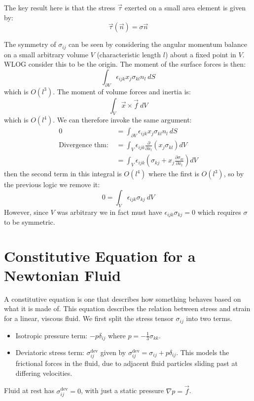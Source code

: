 \documentclass[../Main.tex]{subfiles}
\begin{document}
The key result here is that the stress $\vec\tau$ exerted on a small area element is given by:
\begin{equation*}
    \vec\tau(\vec{n}) = \sigma\vec{n}
\end{equation*}

The symmetry of $\sigma_{ij}$ can be seen by considering the angular momentum balance on a small arbitrary volume $V$ (characteristic length $l$) about a fixed point in $V$. WLOG consider this to be the origin. The moment of the surface forces is then:
\begin{equation*}
    \int_{\partial V} \epsilon_{ijk} x_j \sigma_{kl} n_l~dS
\end{equation*}
which is $O(l^3)$. The moment of volume forces and inertia is:
\begin{equation*}
    \int_V \vec{x} \times \vec{f}~dV
\end{equation*}
which is $O(l^4)$. We can therefore invoke the same argument:
\begin{align*}
    0 &= \int_{\partial V} \epsilon_{ijk} x_j \sigma_{kl} n_l~dS \\
    \text{Divergence thm: } &= \int_V \epsilon_{ijk} \frac{\partial}{\partial x_l} \left(x_j \sigma_{kl}\right) dV \\
    &= \int_V \epsilon_{ijk} \left(\sigma_{kj} + x_j \frac{\partial \sigma_{kl}}{\partial x_l}\right) dV
\end{align*}
then the second term in this integral is $O(l^4)$ where the first is $O(l^3)$, so by the previous logic we remove it:
\begin{equation*}
    0 = \int_V \epsilon_{ijk} \sigma_{kj}~dV
\end{equation*}
However, since $V$ was arbitrary we in fact must have $\epsilon_{ijk} \sigma_{kj} = 0$ which requires $\sigma$ to be symmetric.
\section{Constitutive Equation for a Newtonian Fluid}
A constitutive equation is one that describes how something behaves based on what it is made of. This equation describes the relation between stress and strain for a linear, viscous fluid. We first split the stress tensor $\sigma_{ij}$ into two terms.
\begin{itemize}
    \item Isotropic pressure term: $-p\delta_{ij}$ where $p = -\frac13 \sigma_{kk}$.
    \item Deviatoric stress term: $\sigma_{ij}^{\text{dev}}$ given by $\sigma_{ij}^\text{dev} = \sigma_{ij} + p \delta_{ij}$. This models the frictional forces in the fluid, due to adjacent fluid particles sliding past at differing velocities.
\end{itemize}
Fluid at rest has $\sigma_{ij}^\text{dev} = 0$, with just a static pressure $\nabla p = \vec{f}$.
\end{document}
